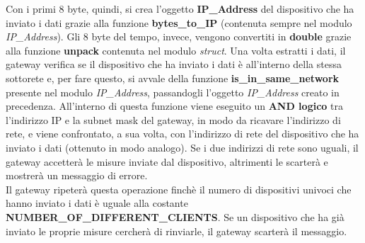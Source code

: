\documentclass[a4paper, 14pt]{extreport}
\begin{document}
    Con i primi 8 byte, quindi, si crea l'oggetto \textbf{IP\_Address} del dispositivo che ha inviato i dati
    grazie alla funzione \textbf{bytes\_to\_IP} (contenuta sempre nel modulo \emph{IP\_Address}).
    Gli 8 byte del tempo, invece, vengono convertiti in \textbf{double} grazie alla funzione \textbf{unpack}
    contenuta nel modulo \emph{struct}.
    Una volta estratti i dati, il gateway verifica se il dispositivo che ha inviato i dati è
    all'interno della stessa sottorete e, per fare questo, si avvale della funzione
    \textbf{is\_in\_same\_network} presente nel modulo \emph{IP\_Address}, passandogli l'oggetto
    \emph{IP\_Address} creato in precedenza.
    All'interno di questa funzione viene eseguito un \textbf{AND logico} tra l'indirizzo IP e la subnet mask
    del gateway, in modo da ricavare l'indirizzo di rete, e viene confrontato, a sua volta, con l'indirizzo di rete
    del dispositivo che ha inviato i dati (ottenuto in modo analogo). Se i due indirizzi di rete sono uguali, il
    gateway accetterà le misure inviate dal dispositivo, altrimenti le scarterà e mostrerà un messaggio di errore. \\
    Il gateway ripeterà questa operazione finchè il numero di dispositivi univoci che hanno inviato i dati è
    uguale alla costante \textbf{NUMBER\_OF\_DIFFERENT\_CLIENTS}.
    Se un dispositivo che ha già inviato le proprie misure cercherà di rinviarle,
    il gateway scarterà il messaggio.
\end{document}
